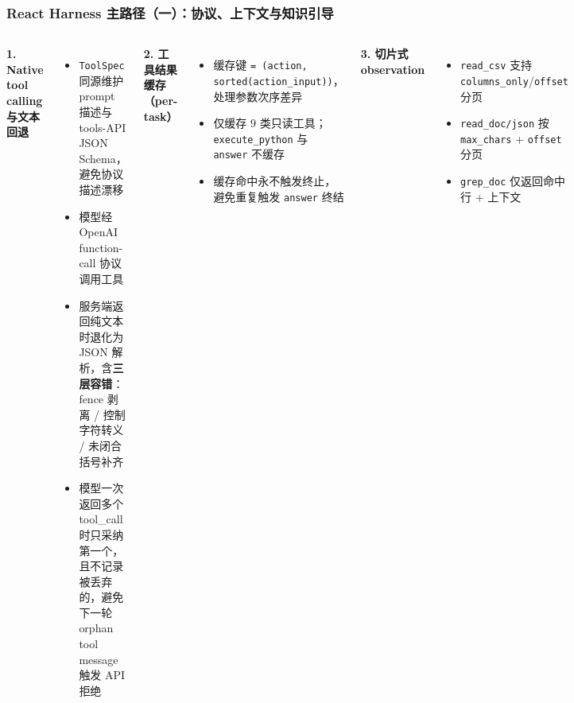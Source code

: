 \documentclass[11pt, aspectratio=169]{beamer}
\begin{document}

\begin{frame}[t]
\frametitle{React Harness 主路径（一）：协议、上下文与知识引导}

\vspace{-0.3em}
\footnotesize
\begin{columns}[T,onlytextwidth]


\textbf{1. Native tool calling 与文本回退}
\begin{itemize}
    \setlength\itemsep{0.05em}
    \item \texttt{ToolSpec} 同源维护 prompt 描述与 tools-API JSON Schema，避免协议描述漂移
    \item 模型经 OpenAI function-call 协议调用工具
    \item 服务端返回纯文本时退化为 JSON 解析，含\textbf{三层容错}：fence 剥离 / 控制字符转义 / 未闭合括号补齐
    \item 模型一次返回多个 tool\_call 时只采纳第一个，且不记录被丢弃的，避免下一轮 orphan tool message 触发 API 拒绝
\end{itemize}

\vspace{0.3em}

\textbf{2. 工具结果缓存（per-task）}
\begin{itemize}
    \setlength\itemsep{0.05em}
    \item 缓存键 \texttt{= (action, sorted(action\_input))}，处理参数次序差异
    \item 仅缓存 9 类只读工具；\texttt{execute\_python} 与 \texttt{answer} 不缓存
    \item 缓存命中永不触发终止，避免重复触发 \texttt{answer} 终结
\end{itemize}

\vspace{0.3em}

\textbf{3. 切片式 observation}
\begin{itemize}
    \setlength\itemsep{0.05em}
    \item \texttt{read\_csv} 支持 \texttt{columns\_only}/\texttt{offset} 分页
    \item \texttt{read\_doc/json} 按 \texttt{max\_chars} + \texttt{offset} 分页
    \item \texttt{grep\_doc} 仅返回命中行 + 上下文
\end{itemize}


\end{columns}
\end{frame}
\end{document}
